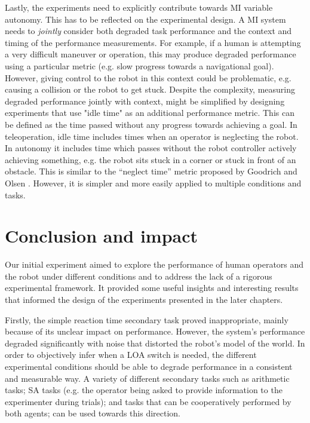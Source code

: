 \documentclass[a4paper,12pt,oneside,openright]{bhamthesis}
\begin{document}
Lastly, the experiments need to explicitly contribute towards MI variable autonomy. This has to be reflected on the experimental design. A MI system needs to \emph{jointly} consider both degraded task performance and the context and timing of the performance measurements. For example, if a human is attempting a very difficult maneuver or operation, this may produce degraded performance using a particular metric (e.g. slow progress towards a navigational goal). However, giving control to the robot in this context could be problematic, e.g. causing a collision or the robot to get stuck. Despite the complexity, measuring degraded performance jointly with context, might be simplified by designing experiments that use "idle time" as an additional performance metric. This can be defined as the time passed without any progress towards achieving a goal. In teleoperation, idle time includes times when an operator is neglecting the robot. In autonomy it includes time which passes without the robot controller actively achieving something, e.g. the robot sits stuck in a corner or stuck in front of an obstacle. This is similar to the ``neglect time'' metric proposed by Goodrich and Olsen \citep{Goodrich2003}. However, it is simpler and more easily applied to multiple conditions and tasks.


\section{Conclusion and impact}
\label{chap3:conclusion}

Our initial experiment aimed to explore the performance of human operators and the robot under different conditions and to address the lack of a rigorous experimental framework. It provided some useful insights and interesting results that informed the design of the experiments presented in the later chapters. 

Firstly, the simple reaction time secondary task proved inappropriate, mainly because of its unclear impact on performance. However, the system's performance degraded significantly with noise that distorted the robot's model of the world. In order to objectively infer when a LOA switch is needed, the different experimental conditions should be able to degrade performance in a consistent and measurable way. A variety of different secondary tasks such as arithmetic tasks; SA tasks (e.g. the operator being asked to provide information to the experimenter during trials); and tasks that can be cooperatively performed by both agents; can be used towards this direction.
\end{document}
